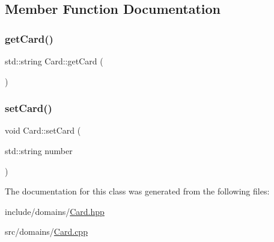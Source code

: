 \subsection{Member Function Documentation}
\mbox{\label{class_card_ab7919dfd991323fbb9a6750ca03a4787}} 
\subsubsection{\texorpdfstring{getCard()}{getCard()}}
{\footnotesize\ttfamily std\+::string Card\+::get\+Card (\begin{DoxyParamCaption}{ }\end{DoxyParamCaption})}

\mbox{\label{class_card_a97571980a043fd28f4a3fc8211d1cae8}} 
\subsubsection{\texorpdfstring{setCard()}{setCard()}}
{\footnotesize\ttfamily void Card\+::set\+Card (\begin{DoxyParamCaption}\item[{std\+::string}]{number }\end{DoxyParamCaption})}



The documentation for this class was generated from the following files\+:\begin{DoxyCompactItemize}
\item 
include/domains/\mbox{\hyperlink{_card_8hpp}{Card.\+hpp}}\item 
src/domains/\mbox{\hyperlink{_card_8cpp}{Card.\+cpp}}\end{DoxyCompactItemize}
